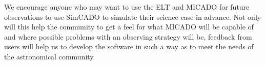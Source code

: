 We encourage anyone who may want to use the ELT and MICADO for future observations to use SimCADO to simulate their science case in advance.
Not only will this help the community to get a feel for what MICADO will be capable of and where possible problems with an observing strategy will be, feedback from users will help us to develop the software in such a way as to meet the needs of the astronomical community.
